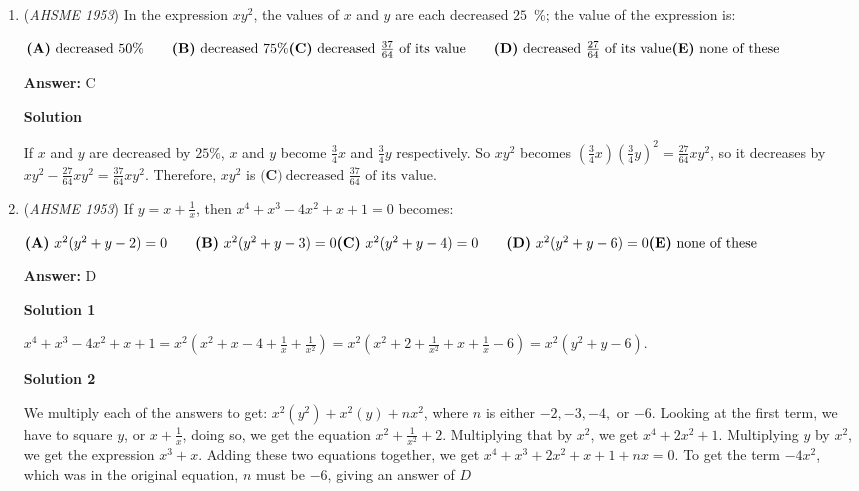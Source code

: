 \begin{enumerate}
 


	\item (\textit{AHSME 1953}) In the expression $xy^2$, the values of $x$ and $y$ are each decreased $25$ \%; the value of the expression is: 


 $\textbf{(A)}\ \text{decreased } 50\% \qquad \textbf{(B)}\ \text{decreased }75\%\\  \textbf{(C)}\ \text{decreased }\frac{37}{64}\text{ of its value}\qquad \textbf{(D)}\ \text{decreased }\frac{27}{64}\text{ of its value}\\ \textbf{(E)}\ \text{none of these}$

 \textbf{Answer: }C



\textbf{Solution}

If $x$ and $y$ are decreased by $25\%$, $x$ and $y$ become $\frac{3}{4}x$ and $\frac{3}{4}y$ respectively.  So $xy^2$ becomes $\left(\frac{3}{4}x\right)\left(\frac{3}{4}y\right)^2 = \frac{27}{64}xy^2$, so it decreases by $xy^2 - \frac{27}{64}xy^2 = \frac{37}{64}xy^2$.  Therefore, $xy^2$ is $\boxed{\textbf{(C)}\ \text{decreased }\frac{37}{64}\text{ of its value}}$.

 


	\item (\textit{AHSME 1953}) If $y=x+\frac{1}{x}$, then $x^4+x^3-4x^2+x+1=0$ becomes: 


 $\textbf{(A)}\ x^2(y^2+y-2)=0 \qquad \textbf{(B)}\ x^2(y^2+y-3)=0\\  \textbf{(C)}\ x^2(y^2+y-4)=0 \qquad \textbf{(D)}\ x^2(y^2+y-6)=0\\ \textbf{(E)}\ \text{none of these}$

 \textbf{Answer: }D



\textbf{Solution 1}

$x^4+x^3-4x^2+x+1 = x^2\left(x^2 + x - 4 + \frac{1}{x} + \frac{1}{x^2}\right) = x^2\left(x^2 + 2 + \frac{1}{x^2} + x + \frac{1}{x} - 6\right) = x^2\left(y^2+y-6\right)$.

 



\textbf{Solution 2}

We multiply each of the answers to get: $x^2(y^2)+x^2(y)+nx^2$, where $n$ is either $-2,-3,-4,$ or $-6$. Looking at the first term, we have to square $y$, or $x+\frac{1}{x}$, doing so, we get the equation $x^2+\frac{1}{x^2}+2$. Multiplying that by $x^2$, we get $x^4+2x^2+1$. Multiplying $y$ by $x^2$, we get the expression $x^3+x$. Adding these two equations together, we get $x^4+x^3+2x^2+x+1+nx=0$. To get the term $-4x^2$, which was in the original equation, $n$ must be $-6$, giving an answer of $\boxed{D}$




\end{enumerate}

